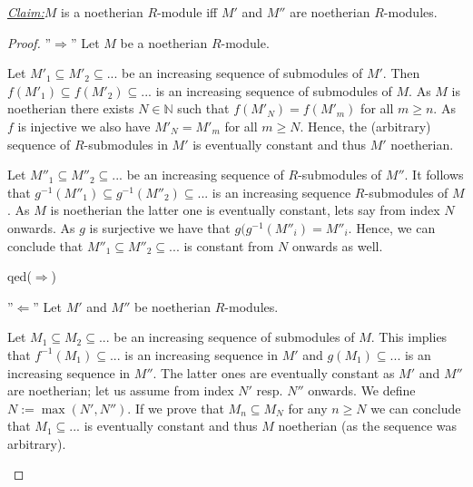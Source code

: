 \documentclass{article}
\newcommand{\N}{\mathbb{N}}
\newcommand{\inv}[1]{{#1}^{-1}}
\newcommand{\claim}
{\underline{\textit{Claim:}}\hspace{0,2cm}}
\newcommand{\subqed}[1]{\hfill\textsf{qed}({#1})}
\theoremstyle{definition}
\theoremstyle{plain}
\theoremstyle{remark}
\begin{document}
\claim $M$ is a noetherian $R$-module iff $M'$ and $M''$ are noetherian $R$-modules.
\begin{proof}
''$\Longrightarrow$'' Let $M$ be a noetherian $R$-module. 

Let $M'_1\subseteq M'_2 \subseteq ...$ be an increasing sequence of submodules of $M'$. Then $f(M'_1)\subseteq f(M'_2)\subseteq ...$ is an increasing sequence of submodules of $M$. As $M$ is noetherian there exists $N\in \N$ such that $f(M'_N)=f(M'_m)$ for all $m\geq n$. As $f$ is injective we also have $M'_N = M'_m$ for all $m\geq N$. Hence, the (arbitrary) sequence of $R$-submodules in $M'$ is eventually constant and thus $M'$ noetherian.\smallskip

Let $M''_1\subseteq M''_2\subseteq ...$ be an increasing sequence of $R$-submodules of $M''$. It follows that $\inv{g}(M''_1)\subseteq\inv{g}(M''_2)\subseteq ...$ is an increasing sequence $R$-submodules of $M$. As $M$ is noetherian the latter one is eventually constant, lets say from index $N$ onwards. As $g$ is surjective we have that $g(\inv{g}(M''_i)=M''_i$. Hence, we can conclude that $M''_1\subseteq M''_2\subseteq ...$ is constant from $N$ onwards as well. 

\subqed{$\Rightarrow$}

''$\Longleftarrow$'' Let $M'$ and $M''$ be noetherian $R$-modules.

Let $M_1\subseteq M_2 \subseteq ...$ be an increasing sequence of submodules of $M$.
This implies that $\inv{f}(M_1)\subseteq ...$ is an increasing sequence in $M'$ and $g(M_1)\subseteq...$ is an increasing sequence in $M''$. The latter ones are eventually constant as $M'$ and $M''$ are noetherian; let us assume from index $N'$ resp. $N''$ onwards. We define $N:=\max(N',N'')$. If we prove that $M_n\subseteq M_N$ for any $n\geq N$ we can conclude that $M_1\subseteq ...$ is eventually constant and thus $M$ noetherian (as the sequence was arbitrary).
\begin{figure}[ht]
\centering
{}
\caption{}\label{Ex.6Diagram}
\end{figure}


\end{proof}
\end{document}
